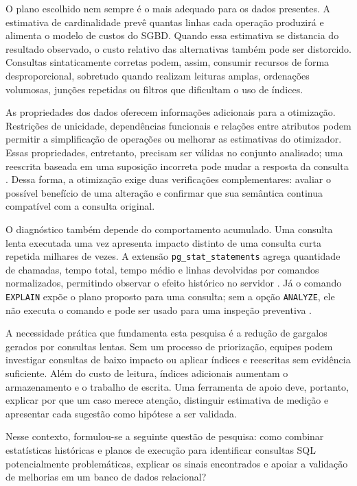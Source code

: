 \documentclass{UNESC}
\newcommand{\codigo}[1]{\texttt{#1}}
\begin{document}
O plano escolhido nem sempre é o mais adequado para os dados presentes. A estimativa de cardinalidade prevê quantas linhas cada operação produzirá e alimenta o modelo de custos do SGBD. Quando essa estimativa se distancia do resultado observado, o custo relativo das alternativas também pode ser distorcido. Consultas sintaticamente corretas podem, assim, consumir recursos de forma desproporcional, sobretudo quando realizam leituras amplas, ordenações volumosas, junções repetidas ou filtros que dificultam o uso de índices.

As propriedades dos dados oferecem informações adicionais para a otimização. Restrições de unicidade, dependências funcionais e relações entre atributos podem permitir a simplificação de operações ou melhorar as estimativas do otimizador. Essas propriedades, entretanto, precisam ser válidas no conjunto analisado; uma reescrita baseada em uma suposição incorreta pode mudar a resposta da consulta \cite{kossmann2022dependencies}. Dessa forma, a otimização exige duas verificações complementares: avaliar o possível benefício de uma alteração e confirmar que sua semântica continua compatível com a consulta original.

O diagnóstico também depende do comportamento acumulado. Uma consulta lenta executada uma vez apresenta impacto distinto de uma consulta curta repetida milhares de vezes. A extensão \codigo{pg\_stat\_statements} agrega quantidade de chamadas, tempo total, tempo médio e linhas devolvidas por comandos normalizados, permitindo observar o efeito histórico no servidor \cite{postgresql2026pgstat}. Já o comando \codigo{EXPLAIN} expõe o plano proposto para uma consulta; sem a opção \codigo{ANALYZE}, ele não executa o comando e pode ser usado para uma inspeção preventiva \cite{postgresql2026explain}.

A necessidade prática que fundamenta esta pesquisa é a redução de gargalos gerados por consultas lentas. Sem um processo de priorização, equipes podem investigar consultas de baixo impacto ou aplicar índices e reescritas sem evidência suficiente. Além do custo de leitura, índices adicionais aumentam o armazenamento e o trabalho de escrita. Uma ferramenta de apoio deve, portanto, explicar por que um caso merece atenção, distinguir estimativa de medição e apresentar cada sugestão como hipótese a ser validada.

Nesse contexto, formulou-se a seguinte questão de pesquisa: como combinar estatísticas históricas e planos de execução para identificar consultas SQL potencialmente problemáticas, explicar os sinais encontrados e apoiar a validação de melhorias em um banco de dados relacional?
\end{document}
